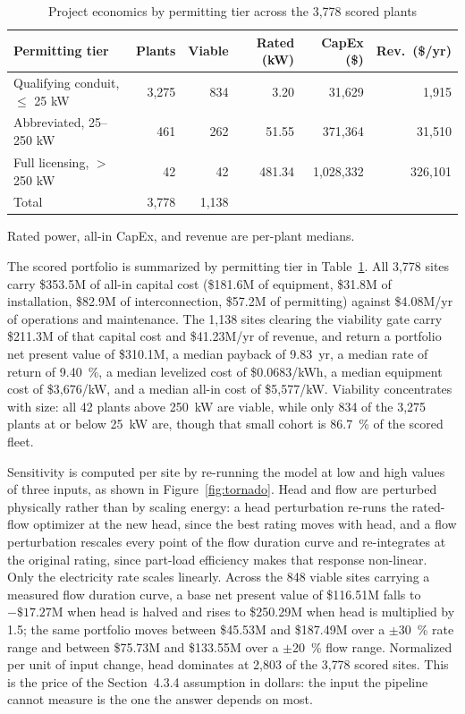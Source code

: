 \documentclass[12pt,letterpaper]{report}
\begin{document}
\begin{table}[htbp]
\centering
\caption{Project economics by permitting tier across the 3,778 scored plants}
\label{tab:tier_econ}
\small
\begin{tabular}{@{}lrrrrr@{}}
\toprule
Permitting tier & Plants & Viable & Rated (kW) & CapEx (\$) & Rev.\ (\$/yr) \\
\midrule
Qualifying conduit, $\leq$ 25 kW & 3{,}275 & 834 & 3.20 & 31{,}629 & 1{,}915 \\
Abbreviated, 25--250 kW          & 461     & 262     & 51.55  & 371{,}364     & 31{,}510  \\
Full licensing, $>$ 250 kW       & 42      & 42      & 481.34 & 1{,}028{,}332 & 326{,}101 \\
\midrule
Total                             & 3{,}778 & 1{,}138 &        &               &           \\
\bottomrule
\end{tabular}

\vspace{0.4em}
{\footnotesize Rated power, all-in CapEx, and revenue are per-plant medians.}
\end{table}

The scored portfolio is summarized by permitting tier in
Table~\ref{tab:tier_econ}. All 3{,}778 sites carry \$353.5M of all-in capital
cost (\$181.6M of equipment, \$31.8M of installation, \$82.9M of
interconnection, \$57.2M of permitting) against \$4.08M/yr of operations and
maintenance. The 1{,}138 sites clearing the viability gate carry \$211.3M of that
capital cost and \$41.23M/yr of revenue, and return a portfolio net present value
of \$310.1M, a median payback of 9.83~yr, a median rate of return of 9.40~\%, a
median levelized cost of \$0.0683/kWh, a median equipment cost of \$3{,}676/kW,
and a median all-in cost of \$5{,}577/kW. Viability concentrates with size: all 42 plants above 250~kW are
viable, while only 834 of the 3{,}275 plants at or below 25~kW are, though that
small cohort is 86.7~\% of the scored fleet.

Sensitivity is computed per site by re-running the model at low and high values of
three inputs, as shown in Figure~\ref{fig:tornado}. Head and flow are perturbed
physically rather than by scaling energy: a head perturbation re-runs the
rated-flow optimizer at the new head, since the best rating moves with head, and a
flow perturbation rescales every point of the flow duration curve and
re-integrates at the original rating, since part-load efficiency makes that
response non-linear. Only the electricity rate scales linearly. Across the 848
viable sites carrying a measured flow duration curve, a base net present value of
\$116.51M falls to $-\$17.27$M when head is halved and rises to \$250.29M when
head is multiplied by 1.5; the same portfolio moves between \$45.53M and
\$187.49M over a $\pm$30~\% rate range and between \$75.73M and \$133.55M over a
$\pm$20~\% flow range. Normalized per unit of input change, head dominates at
2{,}803 of the 3{,}778 scored sites. This is the price of the Section~4.3.4
assumption in dollars: the input the pipeline cannot measure is the one the answer
depends on most.
\end{document}
